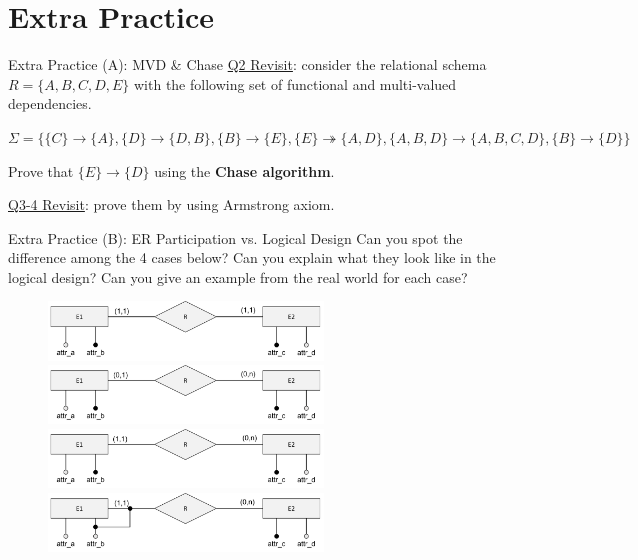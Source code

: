 \section*{Extra Practice}
\begin{frame}[fragile]{Extra Practice (A): MVD \& Chase}
\underline{Q2 Revisit}: consider the relational schema $R = \{A,B,C,D,E\}$ with the following set of functional and multi-valued dependencies.\\ \vspace{5pt}

$\Sigma=\{\{C\}\rightarrow\{A\}, \{D\}\rightarrow\{D,B\}, \{B\}\rightarrow\{E\},\{E\}\twoheadrightarrow\{A,D\},\{A,B,D\}\rightarrow\{A,B,C,D\},\{B\}\rightarrow\{D\}\}$\\ \vspace{5pt}

Prove that $\{E\}\rightarrow\{D\}$ using the \textbf{Chase algorithm}.\\ \vspace{25pt}

\underline{Q3-4 Revisit}: prove them by using Armstrong axiom.\\ 

\end{frame}

\begin{frame}[fragile]{Extra Practice (B): ER Participation vs. Logical Design}
Can you spot the difference among the 4 cases below? Can you explain what they look like in the logical design? Can you give an example from the real world for each case?\\ \vspace{4pt}
	
\begin{figure}
	\includegraphics[width=0.65\textwidth, trim=0 0 0 0, clip]{t4/images/case1.png}
	\includegraphics[width=0.65\textwidth, trim=0 0 0 0, clip]{t4/images/case2.png}
	\includegraphics[width=0.65\textwidth, trim=0 0 0 0, clip]{t4/images/case3.png}
	\includegraphics[width=0.65\textwidth, trim=0 0 0 0, clip]{t4/images/case4.png}
\end{figure}
\end{frame}

